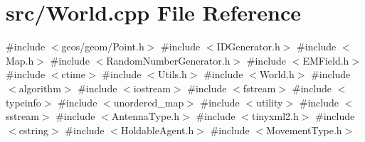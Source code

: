 \section{src/\+World.cpp File Reference}
\label{_world_8cpp}
{\ttfamily \#include $<$geos/geom/\+Point.\+h$>$}\newline
{\ttfamily \#include $<$I\+D\+Generator.\+h$>$}\newline
{\ttfamily \#include $<$Map.\+h$>$}\newline
{\ttfamily \#include $<$Random\+Number\+Generator.\+h$>$}\newline
{\ttfamily \#include $<$E\+M\+Field.\+h$>$}\newline
{\ttfamily \#include $<$ctime$>$}\newline
{\ttfamily \#include $<$Utils.\+h$>$}\newline
{\ttfamily \#include $<$World.\+h$>$}\newline
{\ttfamily \#include $<$algorithm$>$}\newline
{\ttfamily \#include $<$iostream$>$}\newline
{\ttfamily \#include $<$fstream$>$}\newline
{\ttfamily \#include $<$typeinfo$>$}\newline
{\ttfamily \#include $<$unordered\+\_\+map$>$}\newline
{\ttfamily \#include $<$utility$>$}\newline
{\ttfamily \#include $<$sstream$>$}\newline
{\ttfamily \#include $<$Antenna\+Type.\+h$>$}\newline
{\ttfamily \#include $<$tinyxml2.\+h$>$}\newline
{\ttfamily \#include $<$cstring$>$}\newline
{\ttfamily \#include $<$Holdable\+Agent.\+h$>$}\newline
{\ttfamily \#include $<$Movement\+Type.\+h$>$}\newline
